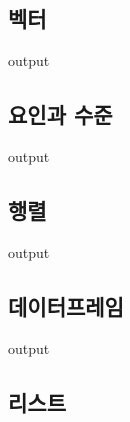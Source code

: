 \documentclass{report}
\begin{document}

\subsection{벡터}

\begin{Schunk}
\begin{Soutput}
output
\end{Soutput}
\end{Schunk}

\subsection{요인과 수준}

\begin{Schunk}
\begin{Soutput}
output
\end{Soutput}
\end{Schunk}

\subsection{행렬}

\begin{Schunk}
\begin{Soutput}
output
\end{Soutput}
\end{Schunk}

\subsection{데이터프레임}

\begin{Schunk}
\begin{Soutput}
output
\end{Soutput}
\end{Schunk}

\subsection{리스트}
\end{document}
